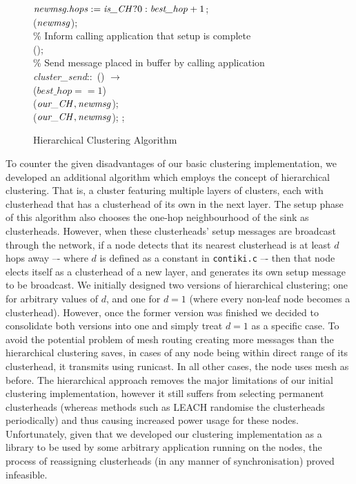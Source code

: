 \begin{figure}[H]
\begin{boxedminipage}{\linewidth}
    \null\qq\qq $\mbox{\emph{newmsg.hops}} \mathrel{:=} \mbox{\emph{is\_CH}} ? 0 : \mbox{\emph{best\_hop}}+1$;\\
    \null\qq\qq {}($\mbox{\emph{newmsg}}$);\\
    \null\qq\qq \% Inform calling application that setup is complete\\
    \null\qq\qq {}();\\
    \null\qq \% Send message placed in buffer by calling application\\
	\null\qq \emph{cluster\_send}::~() $\rightarrow$\\
    \null\qq\qq {} ($best\_hop == 1$)  \\
    \null\qq\qq\qq {}($\mbox{\emph{our\_CH}}, \mbox{\emph{newmsg}}$);
    \null\qq\qq {}\\    
    \null\qq\qq\qq {}($\mbox{\emph{our\_CH}}, \mbox{\emph{newmsg}}$);
    \null\qq\qq {}; \\
  \end{boxedminipage}
  \caption{Hierarchical Clustering Algorithm}
\end{figure}

To counter the given disadvantages of our basic clustering implementation, we developed an additional algorithm which employs the concept of hierarchical clustering. That is, a cluster featuring multiple layers of clusters, each with  clusterhead that has a clusterhead of its own in the next layer. The setup phase of this algorithm also chooses the one-hop neighbourhood of the sink as clusterheads. However, when these clusterheads' setup messages are broadcast through the network, if a node detects that its nearest clusterhead is at least $d$ hops away –- where $d$ is defined as a constant in \verb|contiki.c| –- then that node elects itself as a clusterhead of a new layer, and generates its own setup message to be broadcast. We initially designed two versions of hierarchical clustering; one for arbitrary values of $d$, and one for $d=1$ (where every non-leaf node becomes a clusterhead). However, once the former version was finished we decided to consolidate both versions into one and simply treat $d=1$ as a specific case. To avoid the potential problem of mesh routing creating more messages than the hierarchical clustering saves, in cases of any node being within direct range of its clusterhead, it transmits using runicast. In all other cases, the node uses mesh as before. The hierarchical approach removes the major limitations of our initial clustering implementation, however it still suffers from selecting permanent clusterheads (whereas methods such as LEACH\cite{LEACH} randomise the clusterheads periodically) and thus causing increased power usage for these nodes. Unfortunately, given that we developed our clustering implementation as a library to be used by some arbitrary application running on the nodes, the process of reassigning clusterheads (in any manner of synchronisation) proved infeasible.

